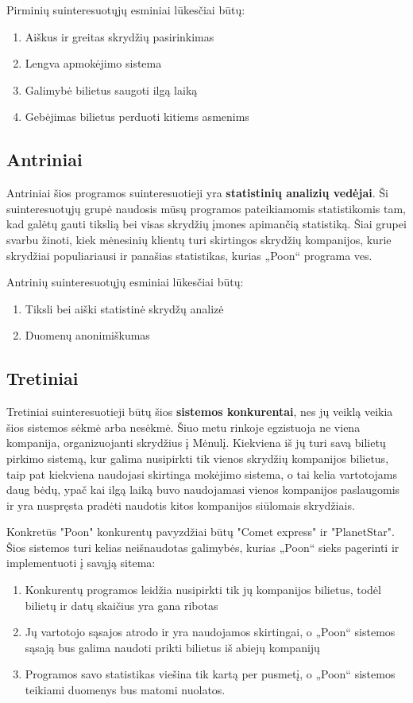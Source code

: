 \documentclass{VUMIFPSkursinis}
\begin{document}
Pirminių suinteresuotųjų esminiai lūkesčiai būtų:
\begin{enumerate}
\item Aiškus ir greitas skrydžių pasirinkimas
\item Lengva apmokėjimo sistema
\item Galimybė bilietus saugoti ilgą laiką
\item Gebėjimas bilietus perduoti kitiems asmenims
\end{enumerate}

\subsection{Antriniai} 
Antriniai šios programos suinteresuotieji yra \textbf{statistinių analizių vedėjai}. Ši suinteresuotųjų grupė naudosis mūsų programos pateikiamomis statistikomis tam, kad galėtų gauti tikslią bei visas skrydžių įmones apimančią statistiką. Šiai grupei svarbu žinoti, kiek mėnesinių klientų turi skirtingos skrydžių kompanijos, kurie skrydžiai populiariausi ir panašias statistikas, kurias „Poon“ programa ves.

Antrinių suinteresuotųjų esminiai lūkesčiai būtų:
\begin{enumerate}
\item Tiksli bei aiški statistinė skrydžų analizė
\item Duomenų anonimiškumas
\end{enumerate}

\subsection{Tretiniai} Tretiniai suinteresuotieji būtų šios \textbf{sistemos konkurentai}, nes jų veiklą veikia šios sistemos sėkmė arba nesėkmė. Šiuo metu rinkoje egzistuoja ne viena kompanija, organizuojanti skrydžius į Mėnulį. Kiekviena iš jų turi savą bilietų pirkimo sistemą, kur galima nusipirkti tik vienos skrydžių kompanijos bilietus, taip pat kiekviena naudojasi skirtinga mokėjimo sistema, o tai kelia vartotojams daug bėdų, ypač kai ilgą laiką buvo naudojamasi vienos kompanijos paslaugomis ir yra nuspręsta pradėti naudotis kitos kompanijos siūlomais skrydžiais. 

Konkretūs "Poon" konkurentų pavyzdžiai būtų "Comet express" ir "PlanetStar". Šios sistemos turi kelias neišnaudotas galimybės, kurias „Poon“ sieks pagerinti ir implementuoti į savąją sitema:
\begin{enumerate}
\item Konkurentų programos leidžia nusipirkti tik jų kompanijos bilietus, todėl bilietų ir datų skaičius yra gana ribotas
\item Jų vartotojo sąsajos atrodo ir yra naudojamos skirtingai, o „Poon“ sistemos sąsają bus galima naudoti prikti bilietus iš abiejų kompanijų
\item Programos savo statistikas viešina tik kartą per pusmetį, o „Poon“ sistemos teikiami duomenys bus matomi nuolatos.
\end{enumerate}
\end{document}
